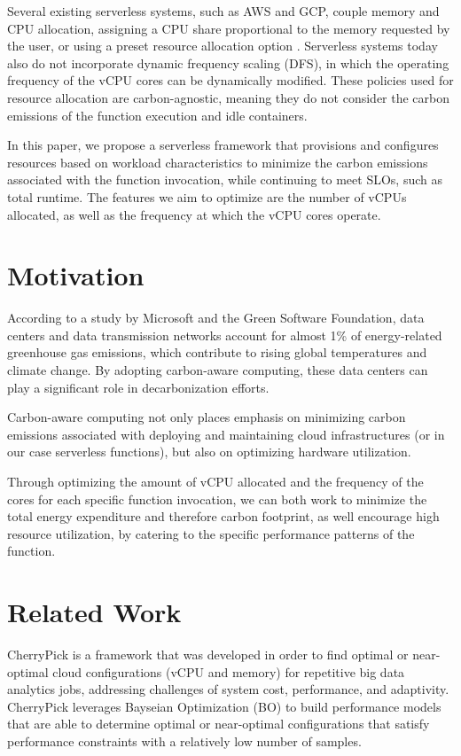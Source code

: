 \documentclass[times, 10pt,twocolumn]{article}
\begin{document}
Several existing serverless systems, such as AWS and GCP, couple memory and CPU allocation, assigning a CPU share proportional to the memory requested by the user, or using a preset resource allocation option \cite{bibal2023acm}. Serverless systems today also do not incorporate dynamic frequency scaling (DFS), in which the operating frequency of the vCPU cores can be dynamically modified. These policies used for resource allocation are carbon-agnostic, meaning they do not consider the carbon emissions of the function execution and idle containers.

In this paper, we propose a serverless framework that provisions and configures resources based on workload characteristics to minimize the carbon emissions associated with the function invocation, while continuing to meet SLOs, such as total runtime. The features we aim to optimize are the number of vCPUs allocated, as well as the frequency at which the vCPU cores operate. 

\section{Motivation}

According to a study by Microsoft and the Green Software Foundation, data centers and data transmission networks account for almost 1\% of energy-related greenhouse gas emissions, which contribute to rising global temperatures and climate change. By adopting carbon-aware computing, these data centers can play a significant role in decarbonization efforts. 

Carbon-aware computing not only places emphasis on minimizing carbon emissions associated with deploying and maintaining cloud infrastructures (or in our case serverless functions), but also on optimizing hardware utilization.       

Through optimizing the amount of vCPU allocated and the frequency of the cores for each specific function invocation, we can both work to minimize the total energy expenditure and therefore carbon footprint, as well encourage high resource utilization, by catering to the specific performance patterns of the function. 
\section{Related Work}
CherryPick\cite{CherryPick} is a framework that was developed in order to find optimal or near-optimal cloud configurations (vCPU and memory) for repetitive big data analytics jobs, addressing challenges of system cost, performance, and adaptivity. CherryPick leverages Bayseian Optimization (BO) to build performance models that are able to determine optimal or near-optimal configurations that satisfy performance constraints with a relatively low number of samples. 
\end{document}
